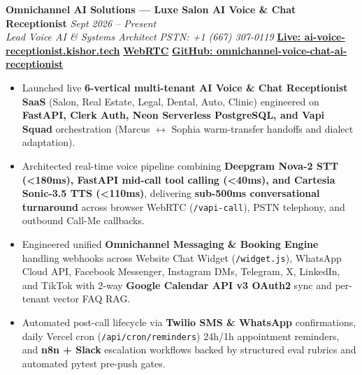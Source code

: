 \documentclass[9.5pt,a4paper]{article}
\begin{document}
\noindent\textbf{Omnichannel AI Solutions --- Luxe Salon AI Voice \& Chat Receptionist} \hfill {\small\textit{Sept 2026 -- Present}}\\
\textit{Lead Voice AI \& Systems Architect \;\textbar\; PSTN: +1 (667) 307-0119} \hfill {\footnotesize\href{https://ai-voice-receptionist.kishor.tech/}{\textbf{Live: ai-voice-receptionist.kishor.tech}} \;\textbar\; \href{https://ai-voice-receptionist.kishor.tech/vapi-call}{\textbf{WebRTC}} \;\textbar\; \href{https://github.com/KishorKumarParoi/omnichannel-voice-chat-ai-receptionist}{\textbf{GitHub: omnichannel-voice-chat-ai-receptionist}}}
\begin{itemize}
    \item Launched live \textbf{6-vertical multi-tenant AI Voice \& Chat Receptionist SaaS} (Salon, Real Estate, Legal, Dental, Auto, Clinic) engineered on \textbf{FastAPI, Clerk Auth, Neon Serverless PostgreSQL, and Vapi Squad} orchestration (Marcus $\leftrightarrow$ Sophia warm-transfer handoffs and dialect adaptation).
    \item Architected real-time voice pipeline combining \textbf{Deepgram Nova-2 STT (<180ms), FastAPI mid-call tool calling (<40ms), and Cartesia Sonic-3.5 TTS (<110ms)}, delivering \textbf{sub-500ms conversational turnaround} across browser WebRTC (\texttt{/vapi-call}), PSTN telephony, and outbound Call-Me callbacks.
    \item Engineered unified \textbf{Omnichannel Messaging \& Booking Engine} handling webhooks across Website Chat Widget (\texttt{/widget.js}), WhatsApp Cloud API, Facebook Messenger, Instagram DMs, Telegram, X, LinkedIn, and TikTok with 2-way \textbf{Google Calendar API v3 OAuth2} sync and per-tenant vector FAQ RAG.
    \item Automated post-call lifecycle via \textbf{Twilio SMS \& WhatsApp} confirmations, daily Vercel cron (\texttt{/api/cron/reminders}) 24h/1h appointment reminders, and \textbf{n8n + Slack} escalation workflows backed by structured eval rubrics and automated pytest pre-push gates.
\end{itemize}
\end{document}

